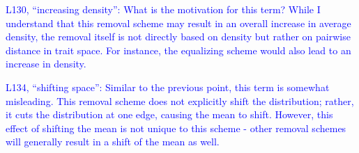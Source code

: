 \documentclass[
]{article}
\begin{document}
\textcolor{blue}{L130, ``increasing density'': What is the motivation for this term? While I understand that this removal scheme may result in an overall increase in average density, the removal itself is not directly based on density but rather on pairwise distance in trait space.
For instance, the equalizing scheme would also lead to an increase in density.}

\textcolor{blue}{L134, ``shifting space'': Similar to the previous point, this term is somewhat misleading.
This removal scheme does not explicitly shift the distribution; rather, it cuts the distribution at one edge, causing the mean to shift.
However, this effect of shifting the mean is not unique to this scheme - other removal schemes will generally result in a shift of the mean as well.}
\end{document}
